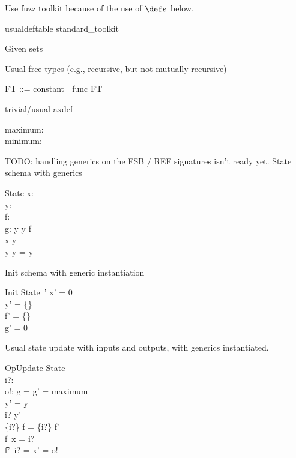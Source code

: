 \documentclass{article}
\begin{document}
Use fuzz toolkit because of the use of $\defs$ below.
%
\begin{zsection}
\SECTION usualdeftable \parents standard\_toolkit
\end{zsection}

Given sets
\begin{zed}
   [G]
\end{zed}

Usual free types (e.g., recursive, but not mutually recursive)
\begin{zed}
   FT ::= constant | func \ldata \nat \cross FT \rdata
\end{zed}

trivial/usual axdef
\begin{axdef}
   maximum: \nat \\
   minimum: \nat
\end{axdef}

TODO: handling generics on the FSB / REF signatures isn't ready yet. 
%
State schema with generics
\begin{schema}{State}%
   x: \nat \\
   y: \power~\nat \\
   f: \nat \pfun \nat \\
   g: \nat
\where
   y \cross y \subseteq f \\
   x \in y \\ 
   y \cap y = y
\end{schema}

Init schema with generic instantiation
\begin{schema}{Init}
   State~'
\where
   x' = 0 \\
   y' = \{\} \\
   f' = \{\} \\
   g' = 0
\end{schema}

Usual state update with inputs and outputs, with generics instantiated.
\begin{schema}{OpUpdate}
   \Delta State \\
   i?: \nat \\
   o!: \nat
\where
   g = g' = maximum \\ %
   y' = y \\
   i? \in y' \\
   \{i?\} \dres f = \{i?\} \dres f' \\ %
   f~x = i? \\
   f'~i? = x' = o!
\end{schema}
\end{document}
